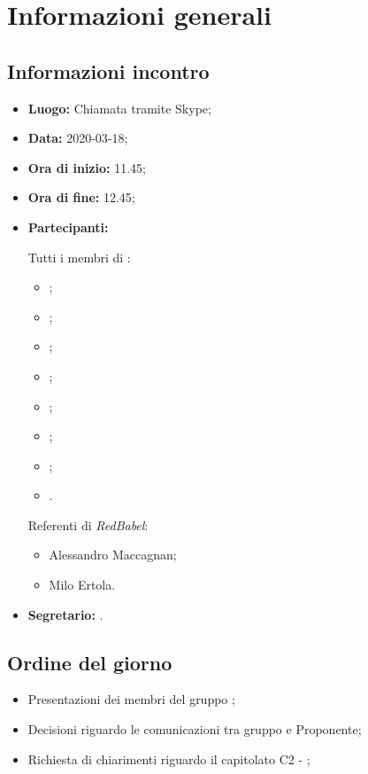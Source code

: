 \section{Informazioni generali}
\subsection{Informazioni incontro}
\begin{itemize}
	\item \textbf{Luogo:} Chiamata tramite Skype;
	\item \textbf{Data:} 2020-03-18;
	\item \textbf{Ora di inizio:} 11.45;
	\item \textbf{Ora di fine:} 12.45;
	\item \textbf{Partecipanti:}
		
		Tutti i membri di \Gruppo:
		\begin{itemize}
			\item \VB;
			\item \LB;
			\item \NF;
			\item \EG;
			\item \FJ;
			\item \MP;
			\item \AS;
			\item \AZ.
		\end{itemize}
		
		Referenti di \textit{RedBabel}:
		\begin{itemize}
			\item Alessandro Maccagnan;
			\item Milo Ertola.
		\end{itemize}
	\item \textbf{Segretario:} \VB.
\end{itemize}

\subsection{Ordine del giorno}
\begin{itemize}
	\item Presentazioni dei membri del gruppo \Gruppo;
	\item Decisioni riguardo le comunicazioni tra gruppo e Proponente;
	\item Richiesta di chiarimenti riguardo il capitolato C2 - \NomeProgetto;
\end{itemize}
